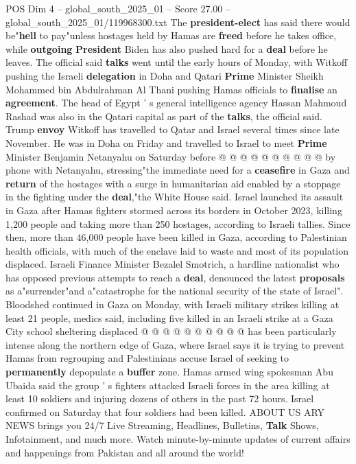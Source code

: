 \begin{textsample}{POS Dim 4 – global\_south\_2025\_01 – Score 27.00 – global\_south\_2025\_01/119968300.txt}
The \textbf{president-elect} has said there would be"\textbf{hell} to pay"unless hostages held by Hamas are \textbf{freed} before he takes office, while \textbf{outgoing} \textbf{President} Biden has also pushed hard for a \textbf{deal} before he leaves.
The official said \textbf{talks} went until the early hours of Monday, with Witkoff pushing the Israeli \textbf{delegation} in Doha and Qatari \textbf{Prime} Minister Sheikh Mohammed bin Abdulrahman Al Thani pushing Hamas officials to \textbf{finalise} an \textbf{agreement}.
The head of Egypt ' s general intelligence agency Hassan Mahmoud Rashad was also in the Qatari capital as part of the \textbf{talks}, the official said.
Trump \textbf{envoy} Witkoff has travelled to Qatar and Israel several times since late November.
He was in Doha on Friday and travelled to Israel to meet \textbf{Prime} Minister Benjamin Netanyahu on Saturday before @ @ @ @ @ @ @ @ @ @ by phone with Netanyahu, stressing"the immediate need for a \textbf{ceasefire} in Gaza and \textbf{return} of the hostages with a surge in humanitarian aid enabled by a stoppage in the fighting under the \textbf{deal},"the White House said.
Israel launched its assault in Gaza after Hamas fighters stormed across its borders in October 2023, killing 1,200 people and taking more than 250 hostages, according to Israeli tallies.
Since then, more than 46,000 people have been killed in Gaza, according to Palestinian health officials, with much of the enclave laid to waste and most of its population displaced.
Israeli Finance Minister Bezalel Smotrich, a hardline nationalist who has opposed previous attempts to reach a \textbf{deal}, denounced the latest \textbf{proposals} as a"surrender"and a"catastrophe for the national security of the state of Israel".
Bloodshed continued in Gaza on Monday, with Israeli military strikes killing at least 21 people, medics said, including five killed in an Israeli strike at a Gaza City school sheltering displaced @ @ @ @ @ @ @ @ @ @ has been particularly intense along the northern edge of Gaza, where Israel says it is trying to prevent Hamas from regrouping and Palestinians accuse Israel of seeking to \textbf{permanently} depopulate a \textbf{buffer} zone.
Hamas armed wing spokesman Abu Ubaida said the group ' s fighters attacked Israeli forces in the area killing at least 10 soldiers and injuring dozens of others in the past 72 hours.
Israel confirmed on Saturday that four soldiers had been killed.
ABOUT US ARY NEWS brings you 24/7 Live Streaming, Headlines, Bulletins, \textbf{Talk} Shows, Infotainment, and much more.
Watch minute-by-minute updates of current affairs and happenings from Pakistan and all around the world!

\end{textsample}
